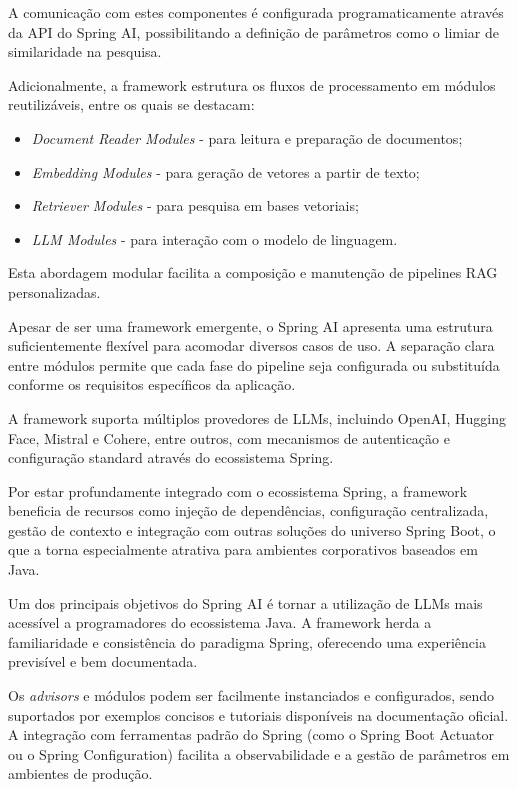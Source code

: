 A comunicação com estes componentes é configurada programaticamente através da API do Spring AI, possibilitando a definição de parâmetros como o limiar de similaridade na pesquisa.

Adicionalmente, a framework estrutura os fluxos de processamento em módulos reutilizáveis, entre os quais se destacam: 
\begin{itemize} 
        \item \emph{Document Reader Modules} - para leitura e preparação de documentos; 
        \item \emph{Embedding Modules} - para geração de vetores a partir de texto; \item \emph{Retriever Modules} - para pesquisa em bases vetoriais; 
        \item \emph{LLM Modules} - para interação com o modelo de linguagem. 
\end{itemize}

Esta abordagem modular facilita a composição e manutenção de pipelines RAG personalizadas.


Apesar de ser uma framework emergente, o Spring AI apresenta uma estrutura suficientemente flexível para acomodar diversos casos de uso. A separação clara entre módulos permite que cada fase do pipeline seja configurada ou substituída conforme os requisitos específicos da aplicação.

A framework suporta múltiplos provedores de LLMs, incluindo OpenAI, Hugging Face, Mistral e Cohere, entre outros, com mecanismos de autenticação e configuração standard através do ecossistema Spring.

Por estar profundamente integrado com o ecossistema Spring, a framework beneficia de recursos como injeção de dependências, configuração centralizada, gestão de contexto e integração com outras soluções do universo Spring Boot, o que a torna especialmente atrativa para ambientes corporativos baseados em Java.


Um dos principais objetivos do Spring AI é tornar a utilização de LLMs mais acessível a programadores do ecossistema Java. A framework herda a familiaridade e consistência do paradigma Spring, oferecendo uma experiência previsível e bem documentada.

Os \textit{advisors} e módulos podem ser facilmente instanciados e configurados, sendo suportados por exemplos concisos e tutoriais disponíveis na documentação oficial. A integração com ferramentas padrão do Spring (como o Spring Boot Actuator ou o Spring Configuration) facilita a observabilidade e a gestão de parâmetros em ambientes de produção.

